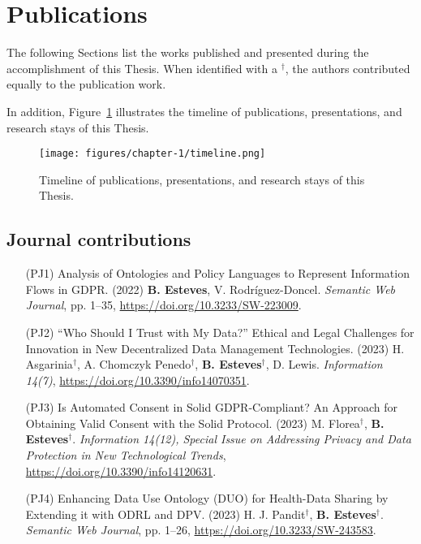 \section{Publications}
\label{sec:publications}

The following Sections list the works published and presented during the accomplishment of this Thesis. When identified with a $^{\dagger}$, the authors contributed equally to the publication work.

In addition, Figure~\ref{fig:timeline} illustrates the timeline of publications, presentations, and research stays of this Thesis.

\begin{figure}[ht]
    \centering
    \texttt{[image: figures/chapter-1/timeline.png]}
    \caption{Timeline of publications, presentations, and research stays of this Thesis.}
    \label{fig:timeline}
\end{figure}

\subsection{Journal contributions}
\label{sec:publications_journal}

\begin{enumerate}
    \item [(PJ1)] Analysis of Ontologies and Policy Languages to Represent Information Flows in GDPR. (2022) \textbf{B. Esteves}, V. Rodríguez-Doncel. \textit{Semantic Web Journal}, pp. 1--35, \url{https://doi.org/10.3233/SW-223009}.
    \item [(PJ2)] ``Who Should I Trust with My Data?'' Ethical and Legal Challenges for Innovation in New Decentralized Data Management Technologies. (2023) H. Asgarinia$^{\dagger}$, A. Chomczyk Penedo$^{\dagger}$, \textbf{B. Esteves}$^{\dagger}$, D. Lewis. \textit{Information 14(7)}, \url{https://doi.org/10.3390/info14070351}.
    \item [(PJ3)] Is Automated Consent in Solid GDPR-Compliant? An Approach for Obtaining Valid Consent with the Solid Protocol. (2023) M. Florea$^{\dagger}$, \textbf{B. Esteves}$^{\dagger}$. \textit{Information 14(12), Special Issue on Addressing Privacy and Data Protection in New Technological Trends}, \url{https://doi.org/10.3390/info14120631}.
    \item [(PJ4)] Enhancing Data Use Ontology (DUO) for Health-Data Sharing by Extending it with ODRL and DPV. (2023) H. J. Pandit$^{\dagger}$, \textbf{B. Esteves}$^{\dagger}$.  \textit{Semantic Web Journal}, pp. 1--26, \url{https://doi.org/10.3233/SW-243583}.
\end{enumerate}

